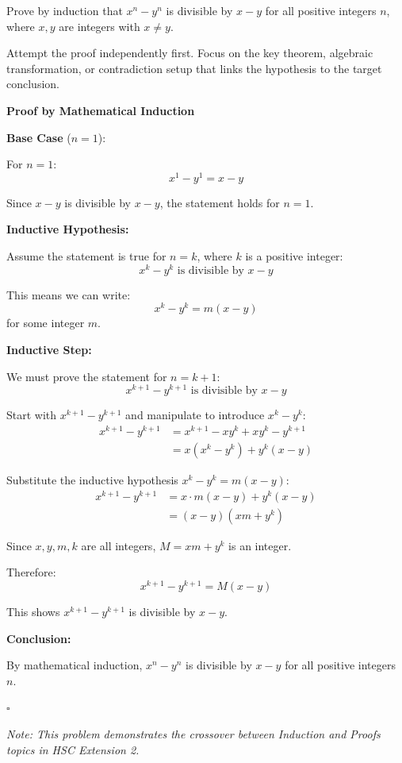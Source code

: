 
\begin{problem}
Prove by induction that $x^n - y^n$ is divisible by $x - y$ for all positive integers $n$, where $x, y$ are integers with $x \neq y$.
\end{problem}

\begin{hint}
Attempt the proof independently first. Focus on the key theorem, algebraic transformation, or contradiction setup that links the hypothesis to the target conclusion.
\end{hint}

\begin{solution}
\textbf{Proof by Mathematical Induction}

\textbf{Base Case} ($n=1$):

For $n=1$:
\[ x^1 - y^1 = x - y \]

Since $x - y$ is divisible by $x - y$, the statement holds for $n=1$. \checkmark

\vspace{0.5em}
\textbf{Inductive Hypothesis:}

Assume the statement is true for $n=k$, where $k$ is a positive integer:
\[ x^k - y^k \text{ is divisible by } x - y \]

This means we can write:
\[ x^k - y^k = m(x - y) \]
for some integer $m$.

\vspace{0.5em}
\textbf{Inductive Step:}

We must prove the statement for $n=k+1$:
\[ x^{k+1} - y^{k+1} \text{ is divisible by } x - y \]

Start with $x^{k+1} - y^{k+1}$ and manipulate to introduce $x^k - y^k$:
\begin{align*}
    x^{k+1} - y^{k+1} &= x^{k+1} - xy^k + xy^k - y^{k+1} \\
    &= x(x^k - y^k) + y^k(x - y)
\end{align*}

Substitute the inductive hypothesis $x^k - y^k = m(x-y)$:
\begin{align*}
    x^{k+1} - y^{k+1} &= x \cdot m(x-y) + y^k(x-y) \\
    &= (x-y)(xm + y^k)
\end{align*}

Since $x, y, m, k$ are all integers, $M = xm + y^k$ is an integer.

Therefore:
\[ x^{k+1} - y^{k+1} = M(x-y) \]

This shows $x^{k+1} - y^{k+1}$ is divisible by $x-y$. \checkmark

\vspace{0.5em}
\textbf{Conclusion:}

By mathematical induction, $x^n - y^n$ is divisible by $x - y$ for all positive integers $n$.

\hfill $\square$

\vspace{1em}
\noindent\textit{Note: This problem demonstrates the crossover between Induction and Proofs topics in HSC Extension 2.}
\end{solution}

